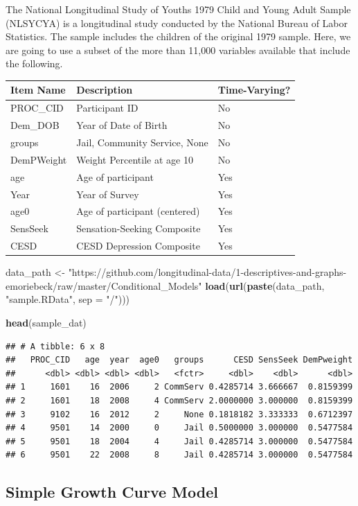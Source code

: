 \documentclass[]{article}
\newenvironment{Shaded}{\begin{snugshade}}{\end{snugshade}}
\newcommand{\KeywordTok}[1]{\textcolor[rgb]{0.13,0.29,0.53}{\textbf{#1}}}
\newcommand{\DataTypeTok}[1]{\textcolor[rgb]{0.13,0.29,0.53}{#1}}
\newcommand{\StringTok}[1]{\textcolor[rgb]{0.31,0.60,0.02}{#1}}
\newcommand{\NormalTok}[1]{#1}
\begin{document}
The National Longitudinal Study of Youths 1979 Child and Young Adult
Sample (NLSYCYA) is a longitudinal study conducted by the National
Bureau of Labor Statistics. The sample includes the children of the
original 1979 sample. Here, we are going to use a subset of the more
than 11,000 variables available that include the following.

\begin{longtable}[]{@{}lll@{}}
\toprule
Item Name & Description & Time-Varying?\tabularnewline
\midrule
\endhead
PROC\_CID & Participant ID & No\tabularnewline
Dem\_DOB & Year of Date of Birth & No\tabularnewline
groups & Jail, Community Service, None & No\tabularnewline
DemPWeight & Weight Percentile at age 10 & No\tabularnewline
age & Age of participant & Yes\tabularnewline
Year & Year of Survey & Yes\tabularnewline
age0 & Age of participant (centered) & Yes\tabularnewline
SensSeek & Sensation-Seeking Composite & Yes\tabularnewline
CESD & CESD Depression Composite & Yes\tabularnewline
\bottomrule
\end{longtable}

\begin{Shaded}
\begin{Highlighting}[]
\NormalTok{data_path <-}\StringTok{ "https://github.com/longitudinal-data/1-descriptives-and-graphs-emoriebeck/raw/master/Conditional_Models"}
\KeywordTok{load}\NormalTok{(}\KeywordTok{url}\NormalTok{(}\KeywordTok{paste}\NormalTok{(data_path, }\StringTok{"sample.RData"}\NormalTok{, }\DataTypeTok{sep =} \StringTok{"/"}\NormalTok{)))}

\KeywordTok{head}\NormalTok{(sample_dat)}
\end{Highlighting}
\end{Shaded}

\begin{verbatim}
## # A tibble: 6 x 8
##   PROC_CID   age  year  age0   groups      CESD SensSeek DemPweight
##      <dbl> <dbl> <dbl> <dbl>   <fctr>     <dbl>    <dbl>      <dbl>
## 1     1601    16  2006     2 CommServ 0.4285714 3.666667  0.8159399
## 2     1601    18  2008     4 CommServ 2.0000000 3.000000  0.8159399
## 3     9102    16  2012     2     None 0.1818182 3.333333  0.6712397
## 4     9501    14  2000     0     Jail 0.5000000 3.000000  0.5477584
## 5     9501    18  2004     4     Jail 0.4285714 3.000000  0.5477584
## 6     9501    22  2008     8     Jail 0.4285714 3.000000  0.5477584
\end{verbatim}

\subsection{Simple Growth Curve Model}\label{simple-growth-curve-model}
\end{document}
